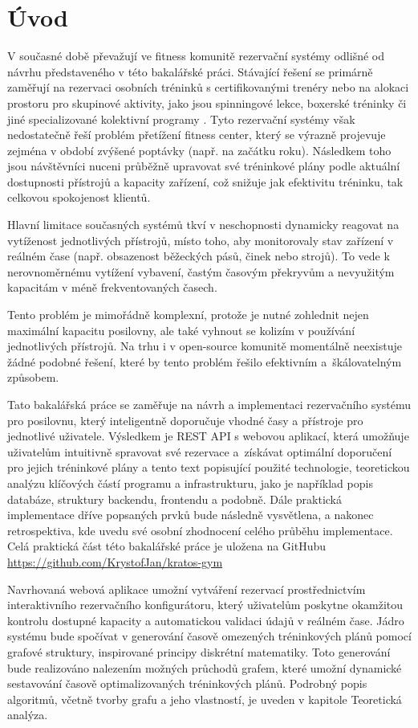 \chapter{Úvod} \label{intro}
\label{sec:Introduction}
V současné době převažují ve fitness komunitě rezervační systémy odlišné od návrhu představeného v této bakalářské práci. Stávající řešení se primárně zaměřují na rezervaci osobních tréninků s certifikovanými trenéry nebo na alokaci prostoru pro skupinové aktivity, jako jsou spinningové lekce, boxerské tréninky či jiné specializované kolektivní programy \cite{gymmasterManagementSoftware, mindbodyonlineBestFitness}. Tyto rezervační systémy však nedostatečně řeší problém přetížení fitness center, který se výrazně projevuje zejména v období zvýšené poptávky (např. na začátku roku). Následkem toho jsou návštěvníci nuceni průběžně upravovat své tréninkové plány podle aktuální dostupnosti přístrojů a kapacity zařízení, což snižuje jak efektivitu tréninku, tak celkovou spokojenost klientů.

Hlavní limitace současných systémů tkví v neschopnosti dynamicky reagovat na vytíženost jednotlivých přístrojů, místo toho, aby monitorovaly stav zařízení v reálném čase (např. obsazenost běžeckých pásů, činek nebo strojů). To vede k nerovnoměrnému vytížení vybavení, častým časovým překryvům a nevyužitým kapacitám v méně frekventovaných časech.

Tento problém je mimořádně komplexní, protože je nutné zohlednit nejen maximální kapacitu posilovny, ale také vyhnout se kolizím v používání jednotlivých přístrojů. Na trhu i v open-source komunitě momentálně neexistuje žádné podobné řešení, které by tento problém řešilo efektivním a~škálovatelným způsobem\cite{bookywayPrenotazioneUniversale}.

Tato bakalářská práce se zaměřuje na návrh a implementaci rezervačního systému pro posilovnu, který inteligentně doporučuje vhodné časy a přístroje pro jednotlivé uživatele. Výsledkem je REST API s webovou aplikací, která umožňuje uživatelům intuitivně spravovat své rezervace a~získávat optimální doporučení pro jejich tréninkové plány a tento text popisující použité technologie, teoretickou analýzu klíčových částí programu a infrastrukturu, jako je například popis databáze, struktury backendu, frontendu a podobně. Dále praktická implementace dříve popsaných prvků bude následně vysvětlena, a nakonec retrospektiva, kde uvedu své osobní zhodnocení celého průběhu implementace. Celá praktická část této bakalářské práce je uložena na GitHubu \url{https://github.com/KrystofJan/kratos-gym}

Navrhovaná webová aplikace umožní vytváření rezervací prostřednictvím interaktivního rezervačního konfigurátoru, který uživatelům poskytne okamžitou kontrolu dostupné kapacity a automatickou validaci údajů v reálném čase. Jádro systému bude spočívat v generování časově omezených tréninkových plánů pomocí grafové struktury, inspirované principy diskrétní matematiky. Toto generování bude realizováno nalezením možných průchodů grafem, které umožní dynamické sestavování časově optimalizovaných tréninkových plánů. Podrobný popis algoritmů, včetně tvorby grafu a jeho vlastností, je uveden v kapitole Teoretická analýza.
\endinput
